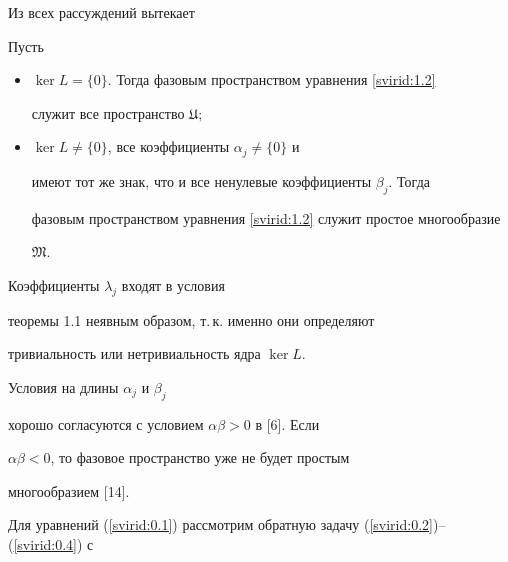Из всех рассуждений вытекает

\begin{theorem}[1.1]

Пусть

\begin{itemize}

    \item [\rm (i)] $\ker L=\{0\}$. Тогда фазовым пространством уравнения \eqref{svirid:1.2}

служит все про\-стран\-ство $\mathfrak{U};$



    \item [\rm (ii)] $\ker L\neq\{0\}$, все коэффициенты $\alpha_j\neq\{0\}$ и

имеют тот же знак, что и все ненулевые коэффициенты $\beta_j$. Тогда

фазовым пространством уравнения \eqref{svirid:1.2} служит простое многообразие

$\mathfrak{M}$.

\end{itemize}

\end{theorem}



\begin{remark}[1.1]

Коэффициенты $\lambda_j$ входят в условия

теоремы 1.1 неявным образом, т.\,к. именно они определяют

тривиальность или нетривиальность ядра $\ker L$.

\end{remark}



\begin{remark}[1.2]

Условия на длины $\alpha_j$ и $\beta_j$

хорошо согласуются с условием $\alpha\beta>0$ в [6]. Если

$\alpha\beta<0$, то фазовое пространство уже не будет простым

многообразием [14].

\end{remark}





Для уравнений (\ref{svirid:0.1}) рассмотрим обратную задачу (\ref{svirid:0.2})--(\ref{svirid:0.4}) с

